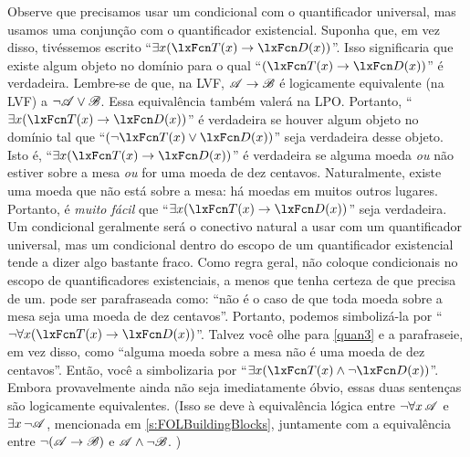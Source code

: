 Observe que precisamos usar um condicional com o quantificador universal, mas usamos uma conjunção com o quantificador existencial. Suponha que, em vez disso, tivéssemos escrito \textquotedblleft $\exists x(\atom{T}{x} \eif \atom{D}{x})$\textquotedblright{}. Isso significaria que existe algum objeto no domínio para o qual \textquotedblleft $(\atom{T}{x} \eif \atom{D}{x})$\textquotedblright{} é verdadeira. Lembre-se de que, na LVF, $\mathscr{A} \rightarrow \mathscr{B}$ é logicamente equivalente (na LVF) a $\neg\mathscr{A} \vee \mathscr{B}$. Essa equivalência também valerá na LPO. Portanto, \textquotedblleft $\exists x(\atom{T}{x} \eif \atom{D}{x})$\textquotedblright{} é verdadeira se houver algum objeto no domínio tal que \textquotedblleft $(\enot \atom{T}{x} \eor \atom{D}{x})$\textquotedblright{} seja verdadeira desse objeto. Isto é, \textquotedblleft $\exists x (\atom{T}{x} \eif \atom{D}{x})$\textquotedblright{} é verdadeira se alguma moeda \emph{ou} não estiver sobre a mesa \emph{ou} for uma moeda de dez centavos. Naturalmente, existe uma moeda que não está sobre a mesa: há moedas em muitos outros lugares. Portanto, é \emph{muito fácil} que \textquotedblleft $\exists x(\atom{T}{x} \eif \atom{D}{x})$\textquotedblright{} seja verdadeira. Um condicional geralmente será o conectivo natural a usar com um quantificador universal, mas um condicional dentro do escopo de um quantificador existencial tende a dizer algo bastante fraco. Como regra geral, não coloque condicionais no escopo de quantificadores existenciais, a menos que tenha certeza de que precisa de um.
 pode ser parafraseada como: \textquotedblleft não é o caso de que toda moeda sobre a mesa seja uma moeda de dez centavos\textquotedblright{}. Portanto, podemos simbolizá-la por \textquotedblleft $\enot \forall x(\atom{T}{x} \eif \atom{D}{x})$\textquotedblright{}. Talvez você olhe para \cref*{quan3} e a parafraseie, em vez disso, como \textquotedblleft alguma moeda sobre a mesa não é uma moeda de dez centavos\textquotedblright{}. Então, você a simbolizaria por \textquotedblleft $\exists x(\atom{T}{x} \eand \enot \atom{D}{x})$\textquotedblright{}. Embora provavelmente ainda não seja imediatamente óbvio, essas duas sentenças são logicamente equivalentes. (Isso se deve à equivalência lógica entre $\neg\forall x\,\mathscr{A}$ e $\exists x\,\neg\mathscr{A}$, mencionada em \cref{s:FOLBuildingBlocks}, juntamente com a equivalência entre $\neg(\mathscr{A}\rightarrow\mathscr{B})$ e $\mathscr{A}\wedge\neg\mathscr{B}$. )

